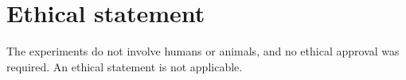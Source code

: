 \section*{Ethical statement}
\label{sec:ethical_statement}
The experiments do not involve humans or animals, and no ethical approval was required. An ethical statement is not applicable.
